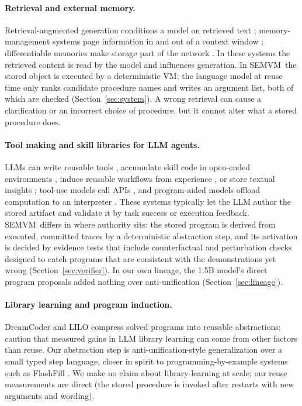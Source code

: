 \documentclass[10pt]{article}
\newcommand{\semvm}{SEMVM}
\begin{document}
\paragraph{Retrieval and external memory.} Retrieval-augmented generation conditions a model on retrieved text \citep{lewis2020rag}; memory-management systems page information in and out of a context window \citep{packer2023memgpt}; differentiable memories make storage part of the network \citep{graves2014ntm}. In these systems the retrieved content is read by the model and influences generation. In \semvm\ the stored object is executed by a deterministic VM; the language model at reuse time only ranks candidate procedure names and writes an argument list, both of which are checked (Section~\ref{sec:system}). A wrong retrieval can cause a clarification or an incorrect choice of procedure, but it cannot alter what a stored procedure does.

\paragraph{Tool making and skill libraries for LLM agents.} LLMs can write reusable tools \citep{cai2024latm, yuan2024craft}, accumulate skill code in open-ended environments \citep{wang2023voyager}, induce reusable workflows from experience \citep{wang2024awm}, or store textual insights \citep{zhao2024expel, shinn2023reflexion}; tool-use models call APIs \citep{schick2023toolformer, patil2024gorilla, yao2023react}, and program-aided models offload computation to an interpreter \citep{gao2023pal}. These systems typically let the LLM author the stored artifact and validate it by task success or execution feedback. \semvm\ differs in where authority sits: the stored program is derived from executed, committed traces by a deterministic abstraction step, and its activation is decided by evidence tests that include counterfactual and perturbation checks designed to catch programs that are consistent with the demonstrations yet wrong (Section~\ref{sec:verifier}). In our own lineage, the 1.5B model's direct program proposals added nothing over anti-unification (Section~\ref{sec:lineage}).

\paragraph{Library learning and program induction.} DreamCoder \citep{ellis2021dreamcoder} and LILO \citep{grand2024lilo} compress solved programs into reusable abstractions; \citet{berlotattwell2024library} caution that measured gains in LLM library learning can come from other factors than reuse. Our abstraction step is anti-unification-style generalization \citep{plotkin1970note} over a small typed step language, closer in spirit to programming-by-example systems such as FlashFill \citep{gulwani2011flashfill}. We make no claim about library-learning at scale; our reuse measurements are direct (the stored procedure is invoked after restarts with new arguments and wording).
\end{document}
